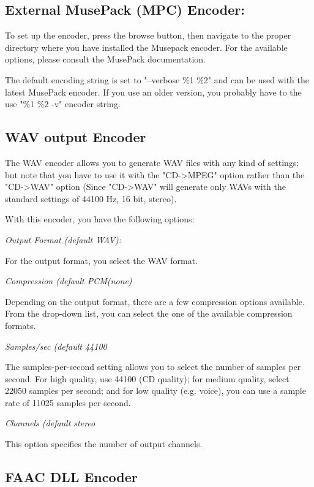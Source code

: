\subsection{External MusePack (MPC) Encoder:}

To set up the encoder, press the browse button, then navigate to the proper directory where you
have installed the Musepack encoder. For the available options, please consult the MusePack documentation.

The default encoding string is set to "--verbose \%1 \%2" and can be used with the latest MusePack encoder.
If you use an older version, you probably have to the use "\%1 \%2 -v" encoder string.


\subsection{WAV output Encoder}

The WAV encoder allows you to generate WAV files with any kind of settings;
but note that you have to use it with the "CD->MPEG" option rather than the
"CD->WAV" option (Since "CD->WAV" will generate only WAVs with the standard
settings of 44100 Hz, 16 bit, stereo).

With this encoder, you have the following options:

{\it Output Format (default WAV):}

For the output format, you select the WAV format.


{\it Compression (default PCM(none)}

Depending on the output format, there are a few compression options available. From the drop-down
list, you can select the one of the available compression formats.

{\it Samples/sec (default 44100}

The samples-per-second setting allows you to select the number of samples per second. For high quality, use 44100 (CD quality); for medium quality, select 22050 samples per second; and for low quality (e.g. voice), you can
use a sample rate of 11025 samples per second.


{\it Channels (default stereo}

This option specifies the number of output channels.


\subsection{FAAC DLL Encoder}

